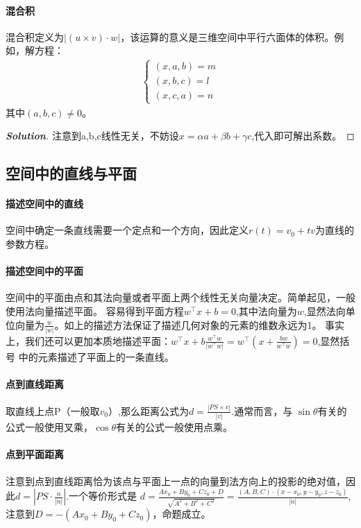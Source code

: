 \documentclass[12pt,a4paper,UTF8]{ctexbook}
\theoremstyle{plain}
\newenvironment{solution}{\begin{proof}[\indent\bf Solution]}{\end{proof}}
\begin{document}
\paragraph{混合积}混合积定义为$|(u\times v)\cdot w|$，该运算的意义是三维空间中平行六面体的体积。例如，解方程：
\begin{align*}
    \left\{\begin{array}{lc}(x,a,b)=m\\(x,b,c)=l\\(x,c,a)=n\end{array}\right.
\end{align*}
其中$(a,b,c)\ne 0$。
\begin{solution}
   注意到a,b,c线性无关，不妨设$x=\alpha a+\beta b+\gamma c$,代入即可解出系数。
\end{solution}
\subsection{空间中的直线与平面}
\paragraph{描述空间中的直线}空间中确定一条直线需要一个定点和一个方向，因此定义$r(t)=v_0+tv$为直线的参数方程。
\paragraph{描述空间中的平面}空间中的平面由点和其法向量或者平面上两个线性无关向量决定。简单起见，一般使用法向量描述平面。
容易得到平面方程$w^\top x+b=0$,其中法向量为$w$,显然法向单位向量为$\frac{w}{|w|}$。如上的描述方法保证了描述几何对象的元素的维数永远为1。
事实上，我们还可以更加本质地描述平面：$w^\top x+b\frac{w^\top w}{|w^\top w|}=w^\top(x+\frac{bw}{w^\top w})=0$,显然括号
中的元素描述了平面上的一条直线。
\paragraph{点到直线距离}取直线上点P（一般取$v_0$）,那么距离公式为$d=\frac{|PS\times v|}{|v|}$.通常而言，与
$\sin \theta$有关的公式一般使用叉乘，$\cos \theta$有关的公式一般使用点乘。
\paragraph{点到平面距离}注意到点到直线距离恰为该点与平面上一点的向量到法方向上的投影的绝对值，因此$d=|PS\cdot\frac{n}{|n|}|$.一个等价形式是
$d=\frac{Ax_0+By_0+Cz_0+D}{\sqrt{A^2+B^2+C^2}}=\frac{(A,B,C)\cdot(x-x_0,y-y_0,z-z_0)}{|n|}$,注意到$D=-(Ax_0+By_0+Cz_0)$，命题成立。
\end{document}

